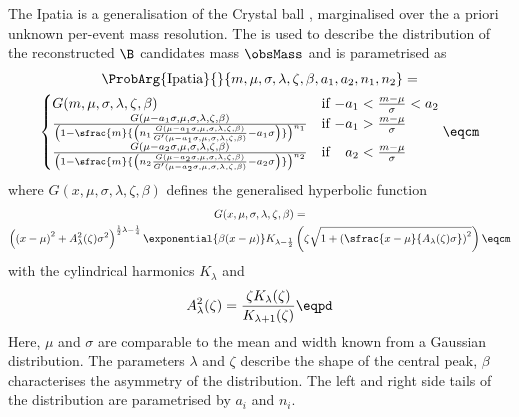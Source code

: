 The Ipatia \PDF \cite{Santos:2013gra} is a generalisation of the Crystal ball
\PDF \cite{Oreglia:1980cs,Gaiser:1982yw,Skwarnicki:1986xj}, marginalised over
the a priori unknown per-event mass resolution. The \PDF is used to describe the
distribution of the reconstructed $\B$ candidates mass $\obsMass$ and is
parametrised as
%
\begin{multline}\label{eq:measurement_of_sin2beta:likelihood_fit:pdfs:ipatia}
  \ProbArg{\text{Ipatia}}{}{m, \mu, \sigma, \lambda, \zeta, \beta, a_1, a_2, n_1, n_2} = \\
    \begin{cases}
      G(m, \mu, \sigma, \lambda, \zeta, \beta)    & \text{if $-a_1 < \frac{m-\mu}{\sigma} < a_2$} \\
      \frac{G(\mu - a_1 \sigma, \mu, \sigma, \lambda, \zeta, \beta)}{
        \left( 1 - \sfrac{m}{\left( n_1 \frac{G(\mu - a_1 \sigma, \mu, \sigma, \lambda, \zeta, \beta)}{G^\prime(\mu - a_1 \sigma, \mu, \sigma, \lambda, \zeta, \beta)} - a_1 \sigma \right)} \right)^{n_1}
      }     & \text{if $-a_1 > \frac{m-\mu}{\sigma}$} \\
      \frac{G(\mu - a_2 \sigma, \mu, \sigma, \lambda, \zeta, \beta)}{
        \left( 1 - \sfrac{m}{\left( n_2 \frac{G(\mu - a_2 \sigma, \mu, \sigma, \lambda, \zeta, \beta)}{G^\prime(\mu - a_2 \sigma, \mu, \sigma, \lambda, \zeta, \beta)} - a_2 \sigma \right)} \right)^{n_2}
      }     & \text{if $\phantom{-}a_2 < \frac{m-\mu}{\sigma}$} \\
  \end{cases}\eqcm
\end{multline}
%
where $G(x, \mu, \sigma, \lambda, \zeta, \beta)$ defines the generalised hyperbolic function
\begin{multline}\label{eq:measurement_of_sin2beta:likelihood_fit:pdfs:generalised_hyperbolic}
  G(x, \mu, \sigma, \lambda, \zeta, \beta) = \\
  \left(\left(x - \mu\right)^2 + A_\lambda^2(\zeta) \sigma^2 \right)^{\frac{1}{2} \lambda - \frac{1}{4}}
  \exponential{\beta (x - \mu)} K_{\lambda-\frac{1}{2}}
  \left(\zeta \sqrt{1 + \left(\sfrac{x - \mu}{A_\lambda(\zeta) \sigma}\right)^2} \right)\eqcm
\end{multline}
%
with the cylindrical harmonics $K_\lambda$ and
%
\begin{equation}
  A_\lambda^2(\zeta) = \frac{\zeta K_\lambda(\zeta)}{K_{\lambda+1}(\zeta)}\eqpd
\end{equation}
%
Here, $\mu$ and $\sigma$ are comparable to the mean and width known from a
Gaussian distribution. The parameters $\lambda$ and $\zeta$ describe the shape
of the central peak, $\beta$ characterises the asymmetry of the distribution.
The left and right side tails of the distribution are parametrised by $a_i$ and
$n_i$.

